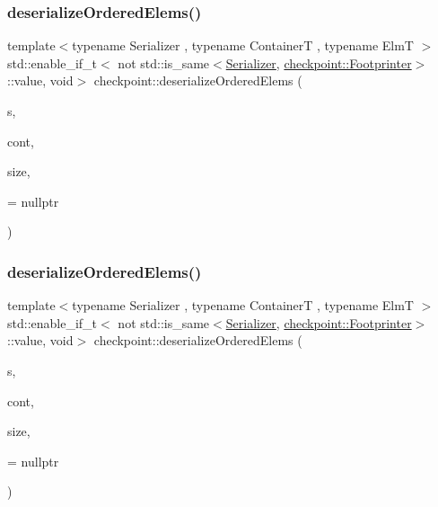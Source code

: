 \subsubsection{\texorpdfstring{deserialize\+Ordered\+Elems()}{deserializeOrderedElems()}\hspace{0.1cm}{\footnotesize\ttfamily [1/3]}}
{\footnotesize\ttfamily template$<$typename Serializer , typename ContainerT , typename ElmT $>$ \\
std\+::enable\+\_\+if\+\_\+t$<$ not std\+::is\+\_\+same$<$\hyperlink{structcheckpoint_1_1_serializer}{Serializer}, \hyperlink{structcheckpoint_1_1_footprinter}{checkpoint\+::\+Footprinter}$>$\+::value, void$>$ checkpoint\+::deserialize\+Ordered\+Elems (\begin{DoxyParamCaption}\item[{\hyperlink{structcheckpoint_1_1_serializer}{Serializer} \&}]{s,  }\item[{ContainerT \&}]{cont,  }\item[{typename Container\+T\+::size\+\_\+type}]{size,  }\item[{\hyperlink{namespacecheckpoint_a60a9850fa59d4b236b2f888baf135a95}{is\+Copy\+Constructible}$<$ ElmT $>$ $\ast$}]{ = {\ttfamily nullptr} }\end{DoxyParamCaption})\hspace{0.3cm}{\ttfamily [inline]}}

\mbox{\label{namespacecheckpoint_abec445c1387cfe9c00c3c328b403378b}} 
\subsubsection{\texorpdfstring{deserialize\+Ordered\+Elems()}{deserializeOrderedElems()}\hspace{0.1cm}{\footnotesize\ttfamily [2/3]}}
{\footnotesize\ttfamily template$<$typename Serializer , typename ContainerT , typename ElmT $>$ \\
std\+::enable\+\_\+if\+\_\+t$<$ not std\+::is\+\_\+same$<$\hyperlink{structcheckpoint_1_1_serializer}{Serializer}, \hyperlink{structcheckpoint_1_1_footprinter}{checkpoint\+::\+Footprinter}$>$\+::value, void$>$ checkpoint\+::deserialize\+Ordered\+Elems (\begin{DoxyParamCaption}\item[{\hyperlink{structcheckpoint_1_1_serializer}{Serializer} \&}]{s,  }\item[{ContainerT \&}]{cont,  }\item[{typename Container\+T\+::size\+\_\+type}]{size,  }\item[{\hyperlink{namespacecheckpoint_a141a100f9dcca06fb0b6dbf44a5d6756}{is\+Not\+Copy\+Constructible}$<$ ElmT $>$ $\ast$}]{ = {\ttfamily nullptr} }\end{DoxyParamCaption})\hspace{0.3cm}{\ttfamily [inline]}}

